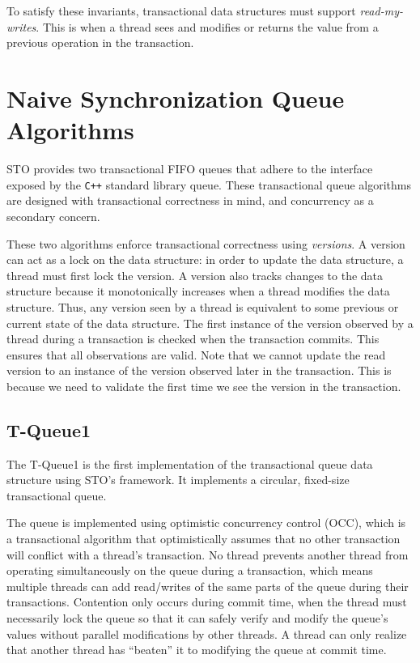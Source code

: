 \noindent
To satisfy these invariants, transactional data structures must support \emph{read-my-writes}. This is when a thread sees and modifies or returns the value from a previous operation in the transaction.


\section{Naive Synchronization Queue Algorithms}

STO provides two transactional FIFO queues that adhere to the interface exposed by the \texttt{C++} standard library queue. These transactional queue algorithms are designed with transactional correctness in mind, and concurrency as a secondary concern. 

These two algorithms enforce transactional correctness using \emph{versions}. A version can act as a lock on the data structure: in order to update the data structure, a thread must first lock the version. A version also tracks changes to the data structure because it monotonically increases when a thread modifies the data structure. Thus, any version seen by a thread is equivalent to some previous or current state of the data structure. The first instance of the version observed by a thread during a transaction is checked when the transaction commits. This ensures that all observations are valid. Note that we cannot update the read version to an instance of the version observed later in the transaction. This is because we need to validate the first time we see the version in the transaction. 

\subsection{T-Queue1}
The T-Queue1 is the first implementation of the transactional queue data structure using STO's framework. It implements a circular, fixed-size transactional queue.

The queue is implemented using optimistic concurrency control (OCC), which is a transactional algorithm that optimistically assumes that no other transaction will conflict with a thread's transaction. No thread prevents another thread from operating simultaneously on the queue during a transaction, which means multiple threads can add read/writes of the same parts of the queue during their transactions. Contention only occurs during commit time, when the thread must necessarily lock the queue so that it can safely verify and modify the queue's values without parallel modifications by other threads. A thread can only realize that another thread has “beaten” it to modifying the queue at commit time.

